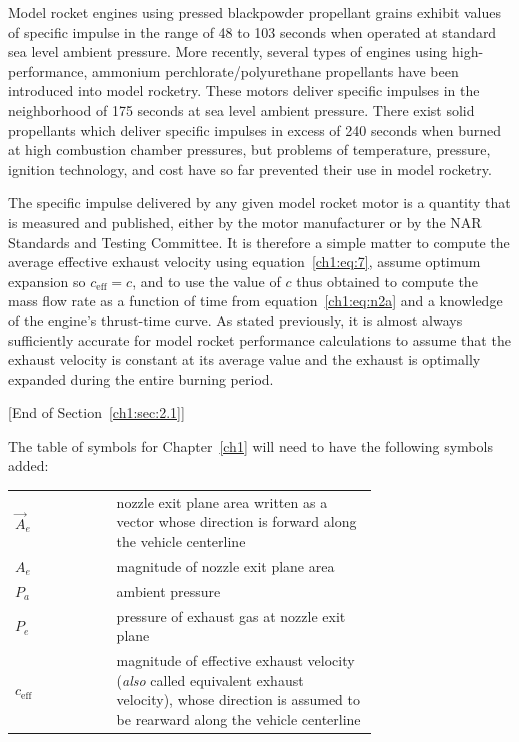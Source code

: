Model rocket engines using pressed blackpowder propellant grains exhibit values of specific impulse in the
range of 48 to 103 seconds when operated at standard sea level ambient pressure. More recently, several
types of engines using high-performance, ammonium perchlorate/polyurethane propellants have been introduced
into model rocketry. These motors deliver specific impulses in the neighborhood of 175 seconds at sea level
ambient pressure. There exist solid propellants which deliver specific impulses in excess of 240 seconds
when burned at high combustion chamber pressures, but problems of temperature, pressure, ignition
technology, and cost have so far prevented their use in model rocketry.

The specific impulse delivered by any given model rocket motor is a quantity that is measured and
published, either by the motor manufacturer or by the NAR Standards and Testing Committee. It is therefore a
simple matter to compute the average effective exhaust velocity using equation~\eqref{ch1:eq:7}, assume
optimum expansion so $c_{\mathrm{eff}} = c$, and to use the value of $c$ thus obtained to compute the mass
flow rate as a function of time from equation~\eqref{ch1:eq:n2a} and a knowledge of the engine's thrust-time
curve. As stated previously, it is almost always sufficiently accurate for model rocket performance
calculations to assume that the exhaust velocity is constant at its average value and the exhaust is
optimally expanded during the entire burning period.

\begin{center}
[End of Section~\ref{ch1:sec:2.1}]

\end{center}

\bigskip
\noindent\begin{minipage}{\linewidth}
The table of symbols for Chapter~\ref{ch1} will need to have the following symbols added:
\begin{center}
\begin{tabular}{@{}l p{0.72\linewidth}@{}}
\toprule
$\vec{A}_e$ & nozzle exit plane area written as a vector whose direction is forward along the vehicle
  centerline \\ \addlinespace
$A_e$ & magnitude of nozzle exit plane area \\ \addlinespace
$P_a$ & ambient pressure \\ \addlinespace
$P_e$ & pressure of exhaust gas at nozzle exit plane \\ \addlinespace
$c_{\mathrm{eff}}$ & magnitude of effective exhaust velocity (\emph{also} called equivalent exhaust
  velocity), whose direction is assumed to be rearward along the vehicle centerline \\
\bottomrule
\end{tabular}
\end{center}
\end{minipage}

